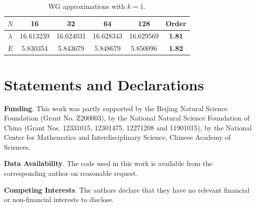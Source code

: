 \documentclass[compress, preprint,9pt]{elsarticle}
\numberwithin{equation}{section}
\begin{document}
\begin{table}[ht!]
	\centering
	\caption{WG approximations with $k=1$.}
	\label{t7}
	\begin{tabular}{|c|c|c|c|c|c|}\hline
		$N$&16&32&64&128&Order\\ \hline\hline
		$\lambda$& 16.613239 & 16.624031 & 16.628343 & 16.629569 & \textbf{1.81} 
		\\ \hline
		$E$& 5.830354 & 5.843679 & 5.848679 & 5.850096 & \textbf{1.82}
		\\ \hline
	\end{tabular}
\end{table}

\section*{Statements and Declarations}

\smallskip
\noindent
\textbf{Funding}.
This work was partly supported by the Beijing Natural Science Foundation (Grant No. Z200003), by the National Natural Science Foundation of China (Grant Nos. 12331015, 12301475, 12271208 and 11901015), by the National Center for Mathematics and Interdisciplinary Science, Chinese Academy of Sciences.

\smallskip
\noindent
\textbf{Data Availability}.
The code used in this work is available from the corresponding author on reasonable request.


\smallskip
\noindent
\textbf{Competing Interests}.
The authors declare that they have no relevant financial or non-financial interests to disclose.




\newpage
\end{document}
